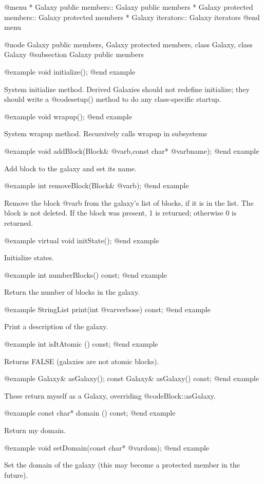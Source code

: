 @menu
* Galaxy public members::       Galaxy public members
* Galaxy protected members::    Galaxy protected members
* Galaxy iterators::            Galaxy iterators
@end menu

@node Galaxy public members, Galaxy protected members, class Galaxy, class Galaxy
@subsection Galaxy public members

@example
void initialize();
@end example

System initialize method.  Derived Galaxies should not redefine
initialize; they should write a @code{setup()} method to do any
class-specific startup.

@example
void wrapup();
@end example

System wrapup method.  Recursively calls wrapup in subsystems

@example
void addBlock(Block& @var{b},const char* @var{bname});
@end example

Add block to the galaxy and set its name.

@example
int removeBlock(Block& @var{b});
@end example

Remove the block @var{b} from the galaxy's list of blocks, if it is in
the list.  The block is not deleted.  If the block was present, 1 is
returned; otherwise 0 is returned.

@example
virtual void initState();
@end example

Initialize states.

@example
int numberBlocks() const;
@end example

Return the number of blocks in the galaxy.

@example
StringList print(int @var{verbose}) const;
@end example

Print a description of the galaxy.

@example
int isItAtomic () const;
@end example

Returns FALSE (galaxies are not atomic blocks).

@example
Galaxy& asGalaxy();
const Galaxy& asGalaxy() const;
@end example

These return myself as a Galaxy, overriding @code{Block::asGalaxy}.

@example
const char* domain () const;
@end example

Return my domain.

@example
void setDomain(const char* @var{dom});
@end example

Set the domain of the galaxy (this may become a protected member
in the future).

